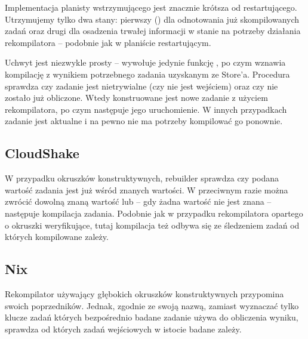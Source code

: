 \pagebreak



Implementacja planisty wstrzymującego jest znacznie krótsza od restartującego. Utrzymujemy tylko dwa stany: pierwszy () dla odnotowania już skompilowanych zadań oraz drugi dla osadzenia trwałej informacji w stanie na potrzeby działania rekompilatora -- podobnie jak w planiście restartującym.



Uchwyt  jest niezwykle prosty -- wywołuje jedynie funkcję , po czym wznawia kompilację z wynikiem potrzebnego zadania uzyskanym ze Store'a. Procedura  sprawdza czy zadanie jest nietrywialne (czy nie jest wejściem) oraz czy nie zostało już obliczone. Wtedy konstruowane jest nowe zadanie z użyciem rekompilatora, po czym następuje jego uruchomienie. W innych przypadkach zadanie jest aktualne i na pewno nie ma potrzeby kompilować go ponownie.

\subsection{CloudShake}





W przypadku okruszków konstruktywnych, rebuilder sprawdza czy podana wartość zadania jest już wśród znanych wartości. W przeciwnym razie można zwrócić dowolną znaną wartość lub -- gdy żadna wartość nie jest znana -- następuje kompilacja zadania. Podobnie jak w przypadku rekompilatora opartego o okruszki weryfikujące, tutaj kompilacja też odbywa się ze śledzeniem zadań od których kompilowane zależy.


\subsection{Nix}



Rekompilator używający głębokich okruszków konstruktywnych przypomina swoich poprzedników. Jednak, zgodnie ze swoją nazwą, zamiast wyznaczać tylko klucze zadań których bezpośrednio badane zadanie używa do obliczenia wyniku, sprawdza od których zadań wejściowych w istocie badane zależy.

